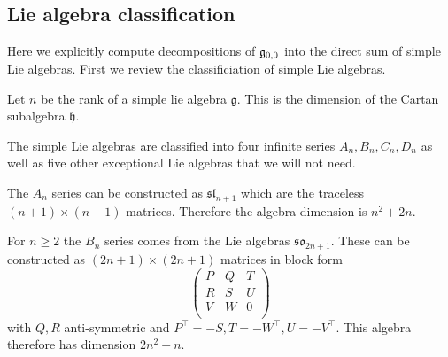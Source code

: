 



\subsection{Lie algebra classification}

Here we explicitly compute decompositions of $\mathfrak{g}_{0,0}$
into the direct sum of simple Lie algebras.
First we review the classificiation of simple Lie algebras.

Let $n$ be the rank of a simple lie algebra $\mathfrak{g}.$
This is the dimension of the Cartan subalgebra $\mathfrak{h}.$

The simple Lie algebras are classified into four infinite series
$A_n, B_n, C_n, D_n$ as well as five other exceptional Lie
algebras that we will not need.

The $A_n$ series can be
constructed as 
$\mathfrak{sl}_{n+1}$ which are the traceless $(n+1)\times (n+1)$ matrices. 
Therefore the algebra dimension is $n^2 + 2n.$

For $n\ge 2$ the $B_n$ series 
comes from the Lie algebras
$\mathfrak{so}_{2n+1}$.
These can be constructed as $(2n+1)\times(2n+1)$ matrices
in block form 
$$
\left(\begin{array}{lll}
P & Q & T\\
R & S & U\\
V & W & 0\\
\end{array}\right)
$$
with $Q,R$ anti-symmetric and 
$P^{\top}=-S,T=-W^{\top},U=-V^{\top}.$
This algebra therefore has dimension $2n^2 + n.$

